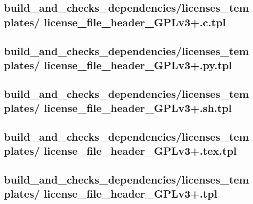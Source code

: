\documentclass{article}
\begin{document}


\subsection{
  build\_and\_checks\_dependencies/licenses\_templates/%
license\_file\_header\_GPLv3+.c.tpl
}
\label{
  build_and_checks_dependencies:licenses_templates:%
license_file_header_GPLv3+ctpl
}



\subsection{
  build\_and\_checks\_dependencies/licenses\_templates/%
license\_file\_header\_GPLv3+.py.tpl
}
\label{
  build_and_checks_dependencies:licenses_templates:%
license_file_header_GPLv3+pytpl
}



\subsection{
  build\_and\_checks\_dependencies/licenses\_templates/%
license\_file\_header\_GPLv3+.sh.tpl
}
\label{
  build_and_checks_dependencies:licenses_templates:%
license_file_header_GPLv3+shtpl
}



\subsection{
  build\_and\_checks\_dependencies/licenses\_templates/%
license\_file\_header\_GPLv3+.tex.tpl
}
\label{
  build_and_checks_dependencies:licenses_templates:%
license_file_header_GPLv3+textpl
}



\subsection{
  build\_and\_checks\_dependencies/licenses\_templates/%
license\_file\_header\_GPLv3+.tpl
}
\label{
  build_and_checks_dependencies:licenses_templates:%
license_file_header_GPLv3+tpl
}
\end{document}
